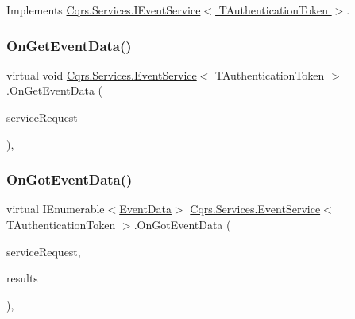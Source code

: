 Implements \hyperlink{interfaceCqrs_1_1Services_1_1IEventService_aa41b82bc398bfab0b2fd519d7f067946_aa41b82bc398bfab0b2fd519d7f067946}{Cqrs.\+Services.\+I\+Event\+Service$<$ T\+Authentication\+Token $>$}.

\mbox{\label{classCqrs_1_1Services_1_1EventService_a1556310c97fbf05df7804d53f91f8511_a1556310c97fbf05df7804d53f91f8511}} 
\subsubsection{\texorpdfstring{On\+Get\+Event\+Data()}{OnGetEventData()}}
{\footnotesize\ttfamily virtual void \hyperlink{classCqrs_1_1Services_1_1EventService}{Cqrs.\+Services.\+Event\+Service}$<$ T\+Authentication\+Token $>$.On\+Get\+Event\+Data (\begin{DoxyParamCaption}\item[{\hyperlink{interfaceCqrs_1_1Services_1_1IServiceRequestWithData}{I\+Service\+Request\+With\+Data}$<$ T\+Authentication\+Token, Guid $>$}]{service\+Request }\end{DoxyParamCaption})\hspace{0.3cm}{\ttfamily [protected]}, {\ttfamily [virtual]}}

\mbox{\label{classCqrs_1_1Services_1_1EventService_a16030e800b05cea77fd2183db7296804_a16030e800b05cea77fd2183db7296804}} 
\subsubsection{\texorpdfstring{On\+Got\+Event\+Data()}{OnGotEventData()}}
{\footnotesize\ttfamily virtual I\+Enumerable$<$\hyperlink{classCqrs_1_1Events_1_1EventData}{Event\+Data}$>$ \hyperlink{classCqrs_1_1Services_1_1EventService}{Cqrs.\+Services.\+Event\+Service}$<$ T\+Authentication\+Token $>$.On\+Got\+Event\+Data (\begin{DoxyParamCaption}\item[{\hyperlink{interfaceCqrs_1_1Services_1_1IServiceRequestWithData}{I\+Service\+Request\+With\+Data}$<$ T\+Authentication\+Token, Guid $>$}]{service\+Request,  }\item[{I\+Enumerable$<$ \hyperlink{classCqrs_1_1Events_1_1EventData}{Event\+Data} $>$}]{results }\end{DoxyParamCaption})\hspace{0.3cm}{\ttfamily [protected]}, {\ttfamily [virtual]}}




